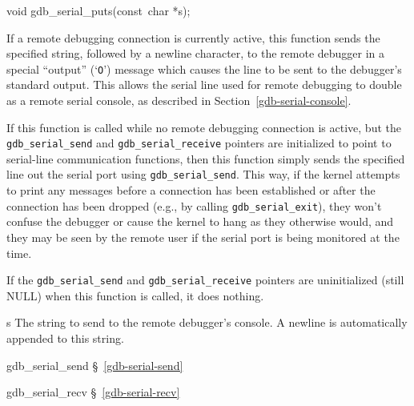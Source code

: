 \label{gdb-serial-puts}
\begin{apisyn}

	\funcproto void gdb_serial_puts(const~char *s);
\end{apisyn}
\begin{apidesc}
	If a remote debugging connection is currently active,
	this function sends the specified string,
	followed by a newline character,
	to the remote debugger in a special ``output'' (`{\tt O}') message
	which causes the line to be sent to the debugger's standard output.
	This allows the serial line used for remote debugging
	to double as a remote serial console,
	as described in Section~\ref{gdb-serial-console}.

	If this function is called
	while no remote debugging connection is active,
	but the {\tt gdb_serial_send} and {\tt gdb_serial_receive} pointers
	are initialized to point to serial-line communication functions,
	then this function simply sends the specified line
	out the serial port using {\tt gdb_serial_send}.
	This way, if the kernel attempts to print any messages
	before a connection has been established
	or after the connection has been dropped
	(e.g., by calling {\tt gdb_serial_exit}),
	they won't confuse the debugger or cause the kernel to hang
	as they otherwise would,
	and they may be seen by the remote user
	if the serial port is being monitored at the time.

	If the {\tt gdb_serial_send} and {\tt gdb_serial_receive} pointers
	are uninitialized (still NULL) when this function is called,
	it does nothing.
\end{apidesc}
\begin{apiparm}
	\item[s]
		The string to send to the remote debugger's console.
		A newline is automatically appended to this string.
\end{apiparm}
\begin{apidep}
	\item[gdb_serial_send]		\S~\ref{gdb-serial-send}
	\item[gdb_serial_recv]		\S~\ref{gdb-serial-recv}
\end{apidep}


